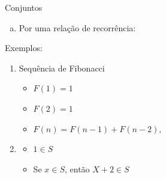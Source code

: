 \documentclass[aspectratio=169]{beamer}
\begin{document}
\begin{frame}{Conjuntos}
    \begin{enumerate}[c)]
        \item Por uma relação de recorrência:
    \end{enumerate}

    \vspace{4mm}
    Exemplos:

    \begin{enumerate}
        \item Sequência de Fibonacci
        
        \begin{itemize}
            \item $F(1) = 1$
            \item $F(2) = 1$
            \item $F(n) = F(n-1) + F(n-2),$
        \end{itemize}

        \vspace{4mm}
        \item 
        
        \begin{itemize}
            \item $1 \in S$
            \item Se $x \in S$, então $X + 2 \in S$
        \end{itemize}
    \end{enumerate}
    

\end{frame}
\end{document}
